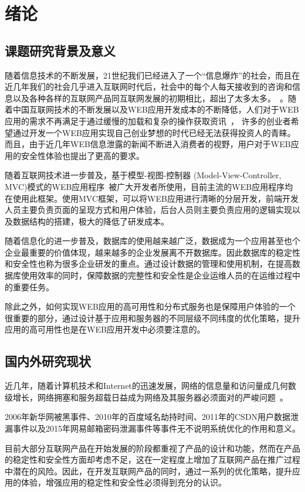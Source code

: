 \chapter{绪论}
\label{cha:introduction}
\section{课题研究背景及意义}
随着信息技术的不断发展，21世纪我们已经进入了一个“信息爆炸”的社会，而且在近几年我们的社会几乎进入互联网时代后，社会中的每个人每天接收到的咨询和信息以及各种各样的互联网产品同互联网发展的初期相比，超出了太多太多。~\cite{林薇2015基于}。随着中国互联网技术的不断发展以及WEB应用开发成本的不断降低，人们对于WEB应用的需求不再满足于通过缓慢的加载和复杂的操作获取资讯~\cite{贺海梁2012基于}，
许多的创业者希望通过开发一个WEB应用实现自己创业梦想的时代已经无法获得投资人的青睐。而且，由于近几年WEB信息泄露的新闻不断进入消费者的视野，用户对于WEB应用的安全性体验也提出了更高的要求。

随着互联网技术进一步普及，基于模型-视图-控制器
(Model-View-Controller, MVC)模式的WEB应用程序~\cite{张2010基于}被广大开发者所使用，目前主流的WEB应用程序均在使用此框架。使用MVC框架，可以将WEB应用进行清晰的分层开发，前端开发人员主要负责页面的呈现方式和用户体验，后台人员则主要负责应用的逻辑实现以及数据结构的搭建，极大的降低了研发成本。

随着信息化的进一步普及，数据库的使用越来越广泛，数据成为一个应用甚至也个企业最重要的价值体现，越来越多的企业发展离不开数据库。因此数据库的稳定性和安全性也称为很多企业研发的重点。通过设计数据的管理和使用机制，在提高数据库使用效率的同时，保障数据的完整性和安全性是企业运维人员的在运维过程中的重要任务。

除此之外，如何实现WEB应用的高可用性和分布式服务也是保障用户体验的一个很重要的部分，通过设计基于应用和服务器的不同层级不同纬度的优化策略，提升应用的高可用性也是在WEB应用开发中必须要注意的。

\section{国内外研究现状}
近几年，随着计算机技术和Internet的迅速发展，网络的信息量和访问量成几何数级增长，网络拥塞和服务超载日益成为网络及其服务器必须面对的严峻问题~\cite{王霜2004web}。

2006年新华网被黑事件、2010年的百度域名劫持时间、2011年的CSDN用户数据泄漏事件以及2015年网易邮箱密码泄漏事件等事件无不说明系统优化的作用和意义。

目前大部分互联网产品在开始发展的阶段都重视了产品的设计和功能，然而在产品的稳定性和安全性方面却考虑不足，这在一定程度上增加了互联网产品在推广过程中潜在的风险。因此，在开发互联网产品的同时，通过一系列的优化策略，提升应用的体验，增强应用的稳定性和安全性必须得到充分的认识。

